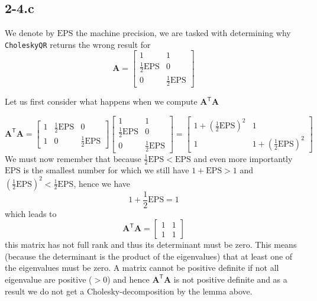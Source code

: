 \documentclass{article}
\newcommand\tr{\mathsf{T}}
\begin{document}
\subsection*{2-4.c}
We denote by $\mathrm{EPS}$ the machine precision, we are tasked with determining why \verb|CholeskyQR| returns the wrong result for 
\begin{equation*}
    \mathbf{A} = 
    \begin{bmatrix}
    1 & 1 \\
    \frac{1}{2}\mathrm{EPS} & 0 \\
    0 & \frac{1}{2}\mathrm{EPS}
    \end{bmatrix}
\end{equation*}

\pagebreak

\noindent Let us first consider what happens when we compute $\mathbf{A}^{\tr}\mathbf{A}$

\begin{equation*}
    \mathbf{A}^{\tr}\mathbf{A} = \begin{bmatrix}
        1 & \frac{1}{2}\mathrm{EPS} & 0 \\
        1 &  0 & \frac{1}{2}\mathrm{EPS}
    \end{bmatrix} 
    \begin{bmatrix}
    1 & 1 \\
    \frac{1}{2}\mathrm{EPS} & 0 \\
    0 & \frac{1}{2}\mathrm{EPS}
    \end{bmatrix} = \begin{bmatrix}
        1 + \left(\frac{1}{2}\mathrm{EPS}\right)^{2} & 1 \\
        1 & 1 + \left(\frac{1}{2}\mathrm{EPS}\right)^{2}
    \end{bmatrix}
\end{equation*}
We must now remember that because $\frac{1}{2}\mathrm{EPS} < \mathrm{EPS}$ and even more importantly $\mathrm{EPS}$ is the smallest number for which we still have $1 + \mathrm{EPS} > 1$ and $\left(\frac{1}{2}\mathrm{EPS}\right)^{2} < \frac{1}{2}\mathrm{EPS}$, hence we have
\begin{equation*}
    1 + \frac{1}{2}\mathrm{EPS} = 1
\end{equation*}
which leads to
\begin{equation*}
    \mathbf{A}^{\tr}\mathbf{A} = \begin{bmatrix}
        1 & 1 \\
        1 & 1
    \end{bmatrix}
\end{equation*}
this matrix has not full rank and thus its determinant must be zero. This means (because the determinant is the product of the eigenvalues) that at least one of the eigenvalues must be zero. A matrix cannot be positive definite if not all eigenvalue are positive ($> 0$) and hence $\mathbf{A}^{\tr}\mathbf{A}$ is not positive definite and as a result we do not get a Cholesky-decomposition by the lemma above.
\end{document}
